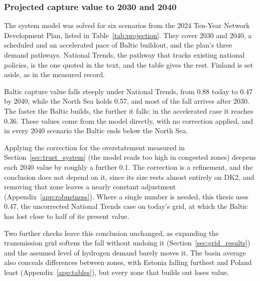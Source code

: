 \subsubsection{Projected capture value to 2030 and 2040}\label{sec:corrected_projection}

The system model was solved for six scenarios from the 2024 Ten-Year Network
Development Plan, listed in Table~\ref{tab:projection}. They cover 2030 and
2040, a scheduled and an accelerated pace of Baltic buildout, and the plan's
three demand pathways. National Trends, the pathway that tracks existing
national policies, is the one quoted in the text, and the table gives the
rest. Finland is set aside, as in the measured record.

Baltic capture value falls steeply under National Trends, from 0.88 today to
0.47 by 2040, while the North Sea holds 0.57, and most of the fall arrives
after 2030. The faster the Baltic builds, the further it
falls: in the accelerated case it reaches 0.36. These values come from the
model directly, with no correction applied, and in every 2040 scenario the
Baltic ends below the North Sea.

Applying the correction for the overstatement measured in
Section~\ref{sec:trust_system} (the model reads too high in congested zones)
deepens each 2040 value by roughly a further 0.1. The correction is a
refinement, and the conclusion does not depend on it, since its size rests
almost entirely on DK2, and removing that zone leaves a nearly constant
adjustment (Appendix~\ref{app:robustness}). Where a single number is needed,
this thesis uses 0.47, the uncorrected National Trends case on today's grid,
at which the Baltic has lost close to half of its present value.

Two further checks leave this conclusion unchanged, as expanding the
transmission grid softens the fall without undoing it
(Section~\ref{sec:grid_results}) and the assumed level of hydrogen demand
barely moves it. The basin average also
conceals differences between zones, with Estonia falling furthest and Poland
least (Appendix~\ref{app:tables}), but every zone that builds out loses value.

